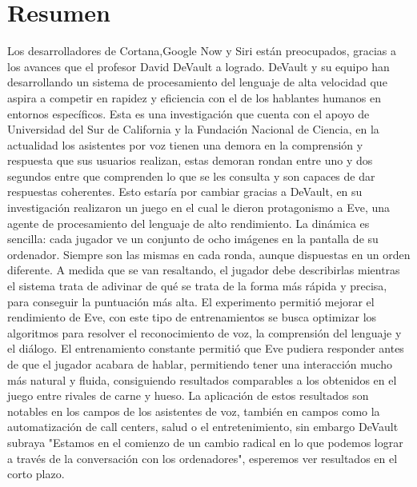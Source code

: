 \documentclass[12pt,letterpaper]{article}
\begin{document}
\section*{\centering Resumen}
Los desarrolladores de Cortana\autocite{cortana},Google Now\autocite{googleNow} y Siri\autocite{siri} están preocupados, gracias a los avances que el profesor David DeVault a logrado. DeVault y su equipo han desarrollando un sistema de procesamiento del lenguaje de alta velocidad\autocite{entiendo:2016} que aspira a competir en rapidez y eficiencia con el de los hablantes humanos en entornos específicos. Esta es una investigación que cuenta con el apoyo de Universidad del Sur de California\autocite{USC} y la Fundación Nacional de Ciencia\autocite{NSF}, en la actualidad los asistentes por voz tienen una demora en la comprensión y respuesta que sus usuarios realizan, estas demoran rondan entre uno y dos segundos entre que comprenden lo que se les consulta y son capaces de dar respuestas coherentes. Esto estaría por cambiar gracias a DeVault, en su investigación realizaron un juego en el cual le dieron protagonismo a Eve, una agente de procesamiento del lenguaje de alto rendimiento. La dinámica es sencilla: cada jugador ve un conjunto de ocho imágenes en la pantalla de su ordenador. Siempre son las mismas en cada ronda, aunque dispuestas en un orden diferente. A medida que se van resaltando, el jugador debe describirlas mientras el sistema trata de adivinar de qué se trata de la forma más rápida y precisa, para conseguir la puntuación más alta. El experimento permitió mejorar el rendimiento de Eve, con este tipo de entrenamientos se busca optimizar los algoritmos para resolver el reconocimiento de voz, la comprensión del lenguaje y el diálogo. El entrenamiento constante permitió que Eve pudiera responder antes de que el jugador acabara de hablar, permitiendo tener una interacción mucho más natural y fluida, consiguiendo resultados comparables a los obtenidos en el juego entre rivales de carne y hueso.
La aplicación de estos resultados son notables en los campos de los asistentes de voz, también en campos como la automatización de call centers, salud o el entretenimiento, sin embargo 	DeVault subraya "Estamos en el comienzo de un cambio radical en lo que podemos lograr a través de la conversación con los ordenadores", esperemos ver resultados en el corto plazo.


\end{document}
